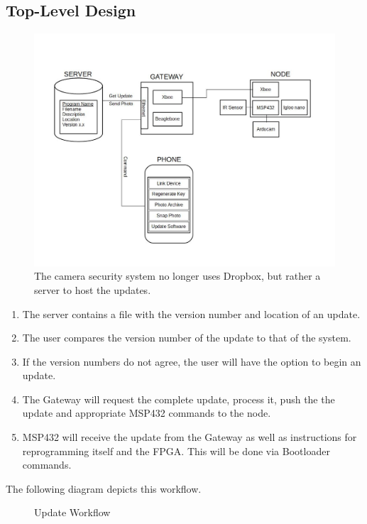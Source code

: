 \documentclass[11pt]{article}
\begin{document}
\subsection{Top-Level Design} 
\begin{figure}[!ht]
\centering
\includegraphics[scale = 0.4]{BlockDiagram.jpg}
\caption{The camera security system no longer uses Dropbox, but rather a server to host the updates.}
\end{figure}
\FloatBarrier


\begin{enumerate}
\item The server contains a file with the version number and location of an update. 
\item The user compares the version number of the update to that of the system.
\item If the version numbers do not agree, the user will have the option to begin an update. 
\item The Gateway will request the complete update, process it, push the the update and appropriate MSP432 commands to the node.
\item MSP432 will receive the update from the Gateway as well as instructions for reprogramming itself and the FPGA. This will be done via Bootloader commands. 
\end{enumerate}
\FloatBarrier

The following diagram depicts this workflow. \vspace{2em}
\begin{figure}[!ht]
\centering
{}
  \caption{Update Workflow}
 \end{figure}
\end{document}
